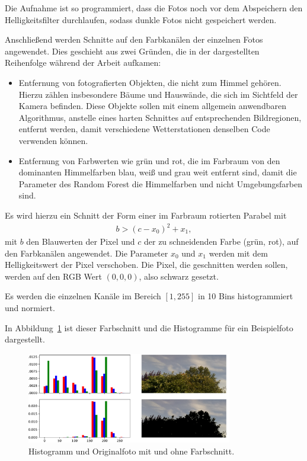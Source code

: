 Die Aufnahme ist so programmiert, dass die Fotos noch vor dem
Abspeichern den Helligkeitsfilter durchlaufen, sodass dunkle Fotos nicht
gespeichert werden.

Anschließend werden Schnitte auf den Farbkanälen der einzelnen Fotos
angewendet. Dies geschieht aus zwei Gründen, die in der dargestellten
Reihenfolge während der Arbeit aufkamen:

\begin{itemize}
\item
  Entfernung von fotografierten Objekten, die nicht zum Himmel gehören.
  Hierzu zählen insbesondere Bäume und Hauswände, die sich im Sichtfeld
  der Kamera befinden. Diese Objekte sollen mit einem allgemein
  anwendbaren Algorithmus, anstelle eines harten Schnittes auf
  entsprechenden Bildregionen, entfernt werden, damit verschiedene
  Wetterstationen denselben Code verwenden können.
\item
  Entfernung von Farbwerten wie grün und rot, die im Farbraum von den
  dominanten Himmelfarben blau, weiß und grau weit entfernt sind, damit
  die Parameter des Random Forest die Himmelfarben und nicht
  Umgebungsfarben sind.
\end{itemize}

Es wird hierzu ein Schnitt der Form einer im Farbraum rotierten Parabel
mit
\begin{align}
  b > {(c - x_0)}^2 + x_1,
\end{align}
mit $b$ den Blauwerten der Pixel und
$c$ der zu schneidenden Farbe (grün, rot), auf den Farbkanälen
angewendet. Die Parameter $x_0$ und $x_1$ werden mit dem
Helligkeitswert der Pixel verschoben. Die Pixel, die geschnitten werden
sollen, werden auf den RGB Wert $(0, 0, 0)$, also schwarz gesetzt.


Es werden die einzelnen Kanäle im Bereich $[1, 255]$ in 10 Bins
histogrammiert und normiert.

In Abbildung~\ref{fig:cut_hist} ist dieser Farbschnitt und die Histogramme für ein Beispielfoto dargestellt.

\begin{figure}
\centering
\includegraphics[width=0.8\textwidth]{pictures/cut_hist.pdf}
\caption{Histogramm und Originalfoto mit und ohne Farbschnitt.}%
\label{fig:cut_hist}
\end{figure}

